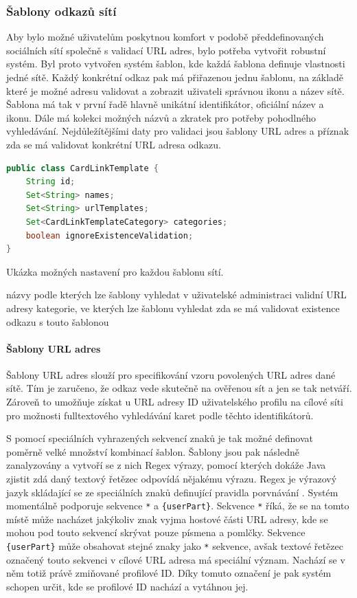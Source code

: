 		\subsubsection{Šablony odkazů sítí}

		Aby bylo možné uživatelům poskytnou komfort v podobě předdefinovaných sociálních sítí společně s validací \ac{URL} adres,
		bylo potřeba vytvořit robustní systém.
		Byl proto vytvořen systém šablon, kde každá šablona definuje vlastnosti jedné sítě.
		Každý konkrétní odkaz pak má přiřazenou jednu šablonu, na základě které je možné adresu validovat a
		zobrazit uživateli správnou ikonu a název sítě.
		Šablona má tak v první řadě hlavně unikátní identifikátor, oficiální název a ikonu.
		Dále má kolekci možných názvů a zkratek pro potřeby pohodlného vyhledávání.
		Nejdůležítějšími daty pro validaci jsou šablony \ac{URL} adres a příznak zda se má validovat konkrétní \ac{URL} adresa odkazu.

		\begin{lstlisting}[language=Java]
public class CardLinkTemplate {
    String id;
    Set<String> names;
    Set<String> urlTemplates;
    Set<CardLinkTemplateCategory> categories;
    boolean ignoreExistenceValidation;
}
		\end{lstlisting}
		Ukázka možných nastavení pro každou šablonu sítí. %

		názvy podle kterých lze šablony vyhledat v uživatelské administraci
		validní URL adresy
		kategorie, ve kterých lze šablonu vyhledat
		zda se má validovat existence odkazu s touto šablonou

			\paragraph{Šablony URL adres}

			Šablony \ac{URL} adres slouží pro specifikování vzoru povolených \ac{URL} adres dané sítě.
			Tím je zaručeno, že odkaz vede skutečně na ověřenou sít a jen se tak netváří.
			Zároveň to umožňuje získat u \ac{URL} adresy ID uživatelského profilu na cílové síti pro možnosti fulltextového
			vyhledávání karet podle těchto identifikátorů.

			S pomocí speciálních vyhrazených sekvencí znaků je tak možné definovat poměrně velké množství kombinací
			šablon.
			Šablony jsou pak následně zanalyzovány a vytvoří se z nich Regex výrazy, pomocí kterých dokáže Java zjistit
			zdá daný textový řetězec odpovídá nějakému výrazu.
			Regex je výrazový jazyk skládající se ze speciálních znaků definující pravidla porvnávání \cite{regex}.
			Systém momentálně podporuje sekvence \lstinline{*} a \lstinline!{userPart}!.
			Sekvence \lstinline{*} říká, že se na tomto místě může nacházet jakýkoliv znak vyjma hostové části \ac{URL}
			adresy, kde se mohou pod touto sekvencí skrývat pouze písmena a pomlčky.
			Sekvence \lstinline!{userPart}! může obsahovat stejné znaky jako \lstinline{*} sekvence, avšak textové
			řetězec označený touto sekvenci v cílové \ac{URL} adresa má speciální význam.
			Nachází se v něm totiž právě zmiňované profilové ID.
			Díky tomuto označení je pak systém schopen určit, kde se profilové ID nachází a vytáhnou jej.

